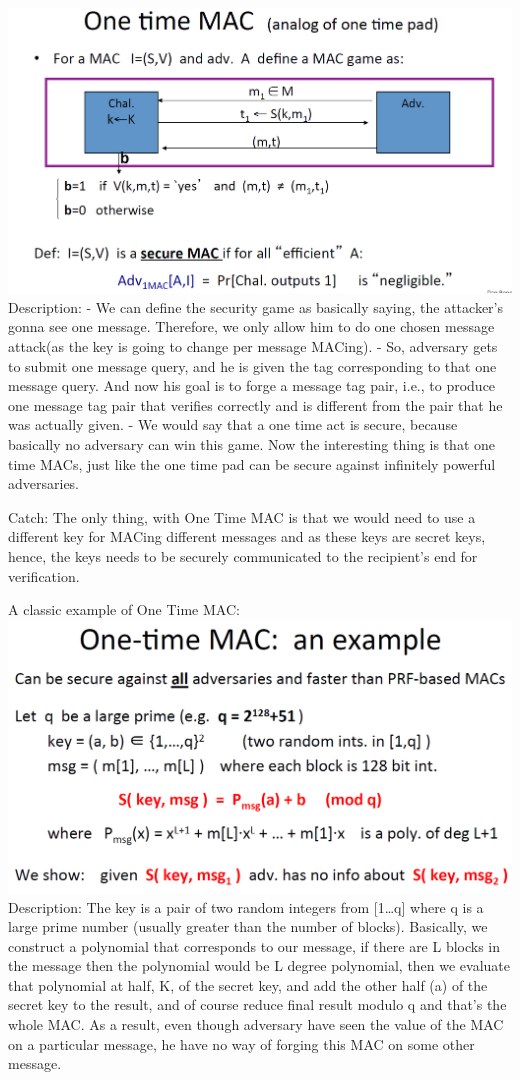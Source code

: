 \documentclass[11pt]{article}
\makeatletter
\def\maxwidth{\ifdim\Gin@nat@width>\linewidth\linewidth
    \else\Gin@nat@width\fi}
\let\Oldincludegraphics\includegraphics
\renewcommand{\includegraphics}[1]{\Oldincludegraphics[width=.8\maxwidth]{#1}}
\makeatother
\begin{document}
\includegraphics{./Images/OneTimeMAC.png} Description: - We can define
the security game as basically saying, the attacker's gonna see one
message. Therefore, we only allow him to do one chosen message attack(as
the key is going to change per message MACing). - So, adversary gets to
submit one message query, and he is given the tag corresponding to that
one message query. And now his goal is to forge a message tag pair,
i.e., to produce one message tag pair that verifies correctly and is
different from the pair that he was actually given. - We would say that
a one time act is secure, because basically no adversary can win this
game. Now the interesting thing is that one time MACs, just like the one
time pad can be secure against infinitely powerful adversaries.

Catch: The only thing, with One Time MAC is that we would need to use a
different key for MACing different messages and as these keys are secret
keys, hence, the keys needs to be securely communicated to the
recipient's end for verification.

A classic example of One Time MAC:
\includegraphics{./Images/OTM-Example.png} Description: The key is a
pair of two random integers from {[}1\ldots{}q{]} where q is a large
prime number (usually greater than the number of blocks). Basically, we
construct a polynomial that corresponds to our message, if there are L
blocks in the message then the polynomial would be L degree polynomial,
then we evaluate that polynomial at half, K, of the secret key, and add
the other half (a) of the secret key to the result, and of course reduce
final result modulo q and that's the whole MAC. As a result, even though
adversary have seen the value of the MAC on a particular message, he
have no way of forging this MAC on some other message.
\end{document}

